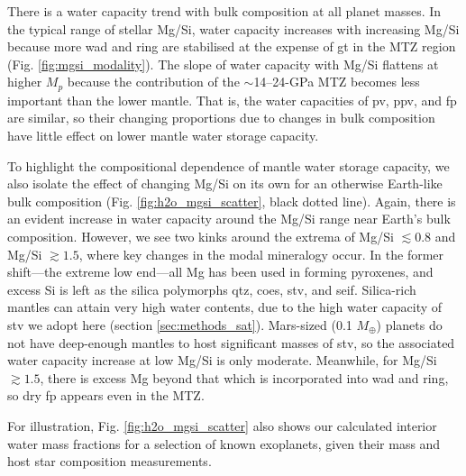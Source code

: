 There is a water capacity trend with bulk composition at all planet masses. In the typical range of stellar Mg/Si, water capacity increases with increasing Mg/Si because more wad and ring are stabilised at the expense of gt in the MTZ region (Fig. \ref{fig:mgsi_modality}). The slope of water capacity with Mg/Si flattens at higher $M_p$ because the contribution of the $\sim$14--24-GPa MTZ becomes less important than the lower mantle. That is, the water capacities of pv, ppv, and fp are similar, so their changing proportions due to changes in bulk composition have little effect on lower mantle water storage capacity.

To highlight the compositional dependence of mantle water storage capacity, we also isolate the effect of changing Mg/Si on its own for an otherwise Earth-like bulk composition (Fig. \ref{fig:h2o_mgsi_scatter}, black dotted line). Again, there is an evident increase in water capacity around the Mg/Si range near Earth's bulk composition. However, we see two kinks around the extrema of Mg/Si $\lesssim 0.8$ and Mg/Si $\gtrsim 1.5$, where key changes in the modal mineralogy occur. In the former shift---the extreme low end---all Mg has been used in forming pyroxenes, and excess Si is left as the silica polymorphs qtz, coes, stv, and seif. Silica-rich mantles can attain very high water contents, due to the high water capacity of stv we adopt here (section \ref{sec:methods_sat}). Mars-sized (0.1 $M_\oplus$) planets do not have deep-enough mantles to host significant masses of stv, so the associated water capacity increase at low Mg/Si is only moderate. Meanwhile, for Mg/Si $\gtrsim1.5$, there is excess Mg beyond that which is incorporated into wad and ring, so dry fp appears even in the MTZ.

For illustration, Fig. \ref{fig:h2o_mgsi_scatter} also shows our calculated interior water mass fractions for a selection of known exoplanets, given their mass and host star composition measurements. %


